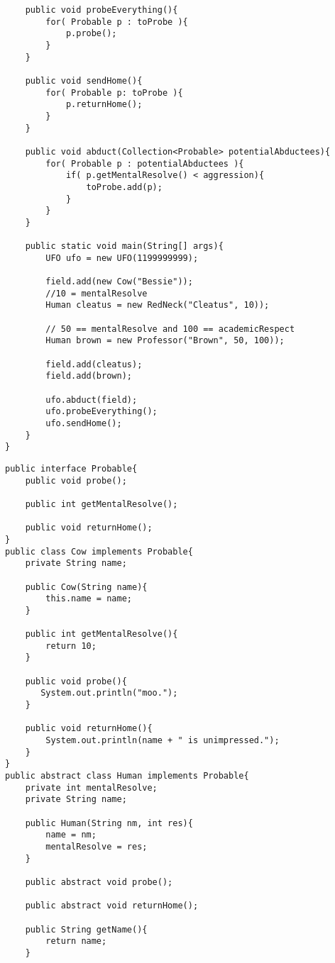 \documentclass[11pt]{article}
\newenvironment{answer}{\large\lstset{basicstyle=\large}\color{white}}{}
\newenvironment{answer}{\large\lstset{basicstyle=\large}\color{red}}{}
\begin{document}
\begin{enumerate}
\begin{lstlisting}
    public void probeEverything(){
        for( Probable p : toProbe ){
            p.probe();
        }
    }

    public void sendHome(){
        for( Probable p: toProbe ){
            p.returnHome();
        }
    }

    public void abduct(Collection<Probable> potentialAbductees){
        for( Probable p : potentialAbductees ){
            if( p.getMentalResolve() < aggression){
                toProbe.add(p);
            }
        }
    }

    public static void main(String[] args){
        UFO ufo = new UFO(1199999999);

        field.add(new Cow("Bessie"));
        //10 = mentalResolve
        Human cleatus = new RedNeck("Cleatus", 10));
        
        // 50 == mentalResolve and 100 == academicRespect
        Human brown = new Professor("Brown", 50, 100));         
        
        field.add(cleatus);
        field.add(brown);

        ufo.abduct(field);
        ufo.probeEverything();
        ufo.sendHome();
    }
}
\end{lstlisting}
\begin{answer}
\begin{lstlisting}
public interface Probable{
    public void probe();

    public int getMentalResolve();

    public void returnHome();
}
public class Cow implements Probable{
    private String name;

    public Cow(String name){
        this.name = name;
    }

    public int getMentalResolve(){
        return 10;
    }

    public void probe(){
       System.out.println("moo.");
    }

    public void returnHome(){
        System.out.println(name + " is unimpressed.");
    }
}
public abstract class Human implements Probable{
    private int mentalResolve;
    private String name;

    public Human(String nm, int res){
        name = nm;
        mentalResolve = res;
    }

    public abstract void probe();

    public abstract void returnHome();

    public String getName(){
        return name;
    }


\end{lstlisting}
\end{answer}
\end{enumerate}
\end{document}
